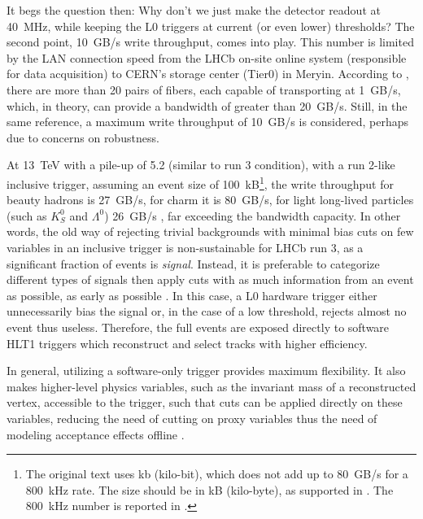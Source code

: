 It begs the question then: Why don't we just make the detector readout at
40~MHz, while keeping the L0 triggers at current (or even lower) thresholds?
The second point, 10~GB/s write throughput,
comes into play.
This number is limited by the LAN connection speed from the LHCb on-site online
system (responsible for data acquisition) to CERN's storage center (Tier0) in
Meryin.
According to \cite{CERN-LHCC-2014-016},
there are more than 20 pairs of fibers, each capable of transporting at 1~GB/s,
which, in theory, can provide a bandwidth of greater than 20~GB/s.
Still, in the same reference, a maximum write throughput of 10~GB/s is
considered, perhaps due to concerns on robustness.

At 13~TeV with a pile-up of 5.2 (similar to run 3 condition),
with a run 2-like inclusive trigger,
assuming an event size of 100~kB\footnote{
    The original text uses kb (kilo-bit), which does not add up to 80~GB/s for
    a 800~kHz rate.
    The size should be in kB (kilo-byte), as supported in
    \cite{CERN-LHCC-2014-016,Allen_GPU_2020}.
    The 800~kHz number is reported in \cite{LHCb-PUB-2014-027}.
},
the write throughput for beauty hadrons is 27~GB/s, for charm it is 80~GB/s,
for light long-lived particles (such as $K^0_S$ and $\Lambda^0$) 26~GB/s
\cite{Albrecht_2014},
far exceeding the bandwidth capacity.
In other words,
the old way of rejecting trivial backgrounds with minimal bias cuts on few
variables in an inclusive trigger is non-sustainable for LHCb run 3,
as a significant fraction of events is \emph{signal}.
Instead, it is preferable to categorize different types of signals then apply
cuts with as much information from an event as possible, as early as possible
\cite{Albrecht_2014}.
In this case, a L0 hardware trigger either unnecessarily bias the signal
or, in the case of a low threshold, rejects almost no event thus useless.
Therefore, the full events are exposed directly to software HLT1 triggers which
reconstruct and select tracks with higher efficiency.

In general,
utilizing a software-only trigger provides maximum flexibility.
It also makes higher-level physics variables,
such as the invariant mass of a reconstructed vertex,
accessible to the trigger,
such that cuts can be applied directly on these variables,
reducing the need of cutting on proxy variables thus the need of modeling
acceptance effects offline \cite{Albrecht_2014}.

